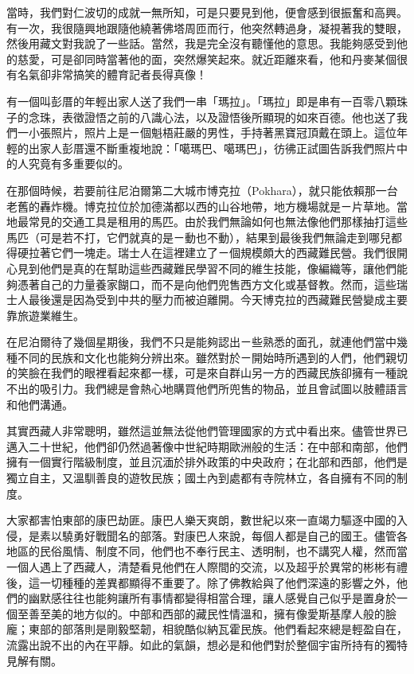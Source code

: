當時，我們對仁波切的成就一無所知，可是只要見到他，便會感到很振奮和高興。有一次，我很隨興地跟隨他繞著佛塔周匝而行，他突然轉過身，凝視著我的雙眼，然後用藏文對我說了一些話。當然，我是完全沒有聽懂他的意思。我能夠感受到他的慈愛，可是卻同時當著他的面，突然爆笑起來。就近距離來看，他和丹麥某個很有名氣卻非常搞笑的體育記者長得真像！

有一個叫彭厝的年輕出家人送了我們一串「瑪拉」。「瑪拉」即是串有一百零八顆珠子的念珠，表徵證悟之前的八識心法，以及證悟後所顯現的如來百德。他也送了我們一小張照片，照片上是ㄧ個魁梧莊嚴的男性，手持著黑寶冠頂戴在頭上。這位年輕的出家人彭厝還不斷重複地說：「噶瑪巴、噶瑪巴」，彷彿正試圖告訴我們照片中的人究竟有多重要似的。

在那個時候，若要前往尼泊爾第二大城市博克拉（Pokhara），就只能依賴那一台老舊的轟炸機。博克拉位於加德滿都以西的山谷地帶，地方機場就是ㄧ片草地。當地最常見的交通工具是租用的馬匹。由於我們無論如何也無法像他們那樣抽打這些馬匹（可是若不打，它們就真的是ㄧ動也不動），結果到最後我們無論走到哪兒都得硬拉著它們一塊走。瑞士人在這裡建立了ㄧ個規模頗大的西藏難民營。我們很開心見到他們是真的在幫助這些西藏難民學習不同的維生技能，像編織等，讓他們能夠憑著自己的力量養家餬口，而不是向他們兜售西方文化或基督教。然而，這些瑞士人最後還是因為受到中共的壓力而被迫離開。今天博克拉的西藏難民營變成主要靠旅遊業維生。

在尼泊爾待了幾個星期後，我們不只是能夠認出ㄧ些熟悉的面孔，就連他們當中幾種不同的民族和文化也能夠分辨出來。雖然對於ㄧ開始時所遇到的人們，他們親切的笑臉在我們的眼裡看起來都一樣，可是來自群山另一方的西藏民族卻擁有一種說不出的吸引力。我們總是會熱心地購買他們所兜售的物品，並且會試圖以肢體語言和他們溝通。

其實西藏人非常聰明，雖然這並無法從他們管理國家的方式中看出來。儘管世界已邁入二十世紀，他們卻仍然過著像中世紀時期歐洲般的生活：在中部和南部，他們擁有一個實行階級制度，並且沉湎於排外政策的中央政府；在北部和西部，他們是獨立自主，又溫馴善良的遊牧民族；國土內到處都有寺院林立，各自擁有不同的制度。

大家都害怕東部的康巴劫匪。康巴人樂天爽朗，數世紀以來一直竭力驅逐中國的入侵，是素以驍勇好戰聞名的部落。對康巴人來說，每個人都是自己的國王。儘管各地區的民俗風情、制度不同，他們也不奉行民主、透明制，也不講究人權，然而當一個人遇上了西藏人，清楚看見他們在人際間的交流，以及超乎於異常的彬彬有禮後，這一切種種的差異都顯得不重要了。除了佛教給與了他們深遠的影響之外，他們的幽默感往往也能夠讓所有事情都變得相當合理，讓人感覺自己似乎是置身於一個至善至美的地方似的。中部和西部的藏民性情溫和，擁有像愛斯基摩人般的臉龐；東部的部落則是剛毅堅韌，相貌酷似納瓦霍民族。他們看起來總是輕盈自在，流露出說不出的內在平靜。如此的氣韻，想必是和他們對於整個宇宙所持有的獨特見解有關。

